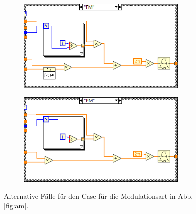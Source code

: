 	\begin{figure}[H]
		\centering
		\begin{subfigure}[c]{\textwidth}
			\centering
			\includegraphics[width=0.9\textwidth]{pic/fm.png}
		\end{subfigure}
		\begin{subfigure}[c]{\textwidth}
			\centering
			\includegraphics[width=0.9\textwidth]{pic/pm.png}
		\end{subfigure}	
		\caption{Alternative Fälle für den Case für die Modulationsart in Abb. \ref{fig:am}.}
		\label{fig:fmpm}	
	\end{figure}
	
